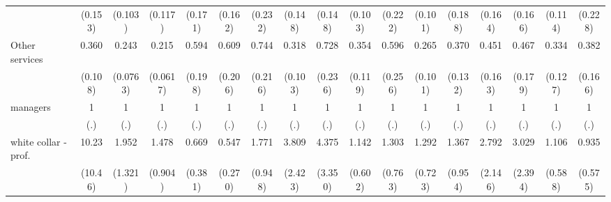 {\begin{tabular}{l*{16}{c}}
                    &     (0.153)         &     (0.103)         &     (0.117)         &     (0.171)         &     (0.162)         &     (0.232)         &     (0.148)         &     (0.148)         &     (0.103)         &     (0.222)         &     (0.101)         &     (0.188)         &     (0.164)         &     (0.166)         &     (0.114)         &     (0.228)         \\
[1em]
Other services      &       0.360\sym{***}&       0.243\sym{***}&       0.215\sym{***}&       0.594         &       0.609         &       0.744         &       0.318\sym{***}&       0.728         &       0.354\sym{**} &       0.596         &       0.265\sym{***}&       0.370\sym{**} &       0.451\sym{*}  &       0.467\sym{*}  &       0.334\sym{**} &       0.382\sym{*}  \\
                    &     (0.108)         &    (0.0763)         &    (0.0617)         &     (0.198)         &     (0.206)         &     (0.216)         &     (0.103)         &     (0.236)         &     (0.119)         &     (0.256)         &     (0.101)         &     (0.132)         &     (0.163)         &     (0.179)         &     (0.127)         &     (0.166)         \\
[1em]
managers            &           1         &           1         &           1         &           1         &           1         &           1         &           1         &           1         &           1         &           1         &           1         &           1         &           1         &           1         &           1         &           1         \\
                    &         (.)         &         (.)         &         (.)         &         (.)         &         (.)         &         (.)         &         (.)         &         (.)         &         (.)         &         (.)         &         (.)         &         (.)         &         (.)         &         (.)         &         (.)         &         (.)         \\
[1em]
white collar - prof.&       10.23\sym{*}  &       1.952         &       1.478         &       0.669         &       0.547         &       1.771         &       3.809\sym{*}  &       4.375         &       1.142         &       1.303         &       1.292         &       1.367         &       2.792         &       3.029         &       1.106         &       0.935         \\
                    &     (10.46)         &     (1.321)         &     (0.904)         &     (0.381)         &     (0.270)         &     (0.948)         &     (2.423)         &     (3.350)         &     (0.602)         &     (0.763)         &     (0.723)         &     (0.954)         &     (2.146)         &     (2.394)         &     (0.588)         &     (0.575)         \\

\end{tabular}}
